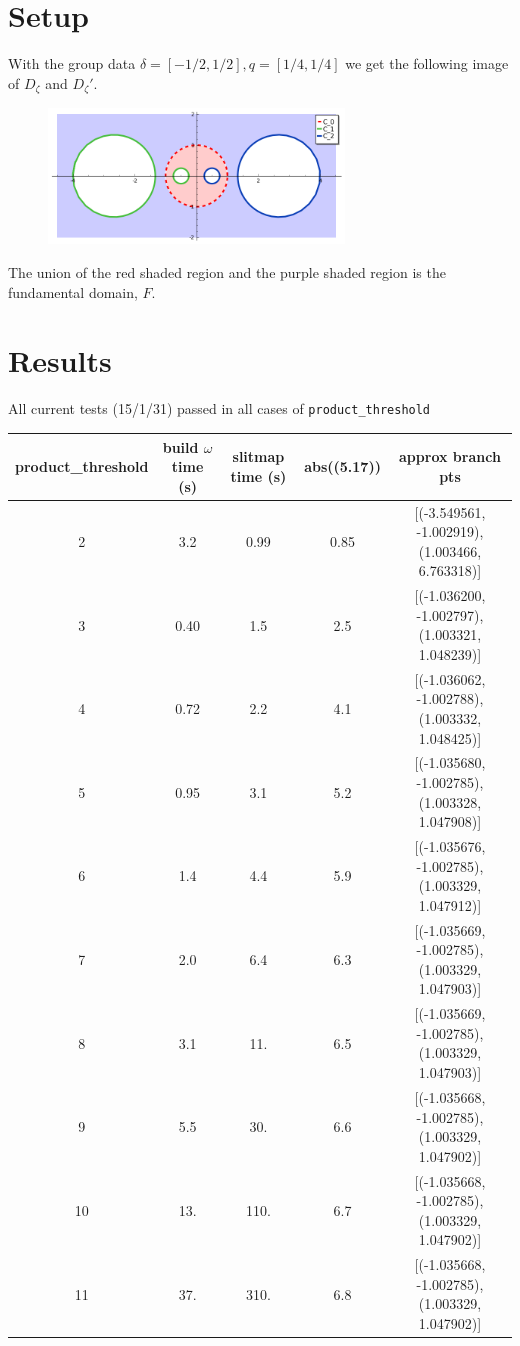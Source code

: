 \documentclass[a4paper,10pt]{article}
\title{}
\author{}
\begin{document}
\maketitle

\section{Setup}
With the group data $\delta = [-1/2,1/2], q = [1/4,1/4]$ we get the following image of $D_\zeta$ and $D_\zeta'$. 
\begin{figure}[ht!]
\centering
\includegraphics[width=0.7\textwidth]{product_threshold_test-FundamentalDomain.png} 
\end{figure}
The union of the red shaded region and the purple shaded region is the fundamental domain, $F$. 

\section{Results}
All current tests (15/1/31) passed in all cases of \verb+product_threshold+
\begin{table}[h!]
 \centering
 \begin{tabular}{c|c|c|c|c}
  product\_threshold &  build $\omega$ time (s) & slitmap time (s)& abs((5.17)) & approx branch pts \\\hline
  2 & 3.2 & 0.99 & 0.85 & [(-3.549561, -1.002919), (1.003466, 6.763318)] \\ \hline
3 & 0.40 & 1.5 & 2.5 & [(-1.036200, -1.002797), (1.003321, 1.048239)] \\ \hline
4 & 0.72 & 2.2 & 4.1 & [(-1.036062, -1.002788), (1.003332, 1.048425)] \\ \hline
5 & 0.95 & 3.1 & 5.2 & [(-1.035680, -1.002785), (1.003328, 1.047908)] \\ \hline
6 & 1.4 & 4.4 & 5.9 & [(-1.035676, -1.002785), (1.003329, 1.047912)] \\ \hline
7 & 2.0 & 6.4 & 6.3 & [(-1.035669, -1.002785), (1.003329, 1.047903)] \\ \hline
8 & 3.1 & 11. & 6.5 & [(-1.035669, -1.002785), (1.003329, 1.047903)] \\ \hline
9 & 5.5 & 30. & 6.6 & [(-1.035668, -1.002785), (1.003329, 1.047902)] \\ \hline
10 & 13. & 110. & 6.7 & [(-1.035668, -1.002785), (1.003329, 1.047902)] \\ \hline
11 & 37. & 310. & 6.8 & [(-1.035668, -1.002785), (1.003329, 1.047902)] \\ \hline
 \end{tabular}
\end{table}
  
\end{document}
